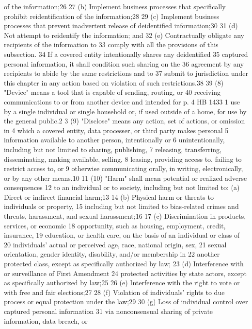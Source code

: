 of the information;26
27 (b) Implement business processes that specifically prohibit
reidentification of the information;28
29 (c) Implement business processes that prevent inadvertent release
of deidentified information;30
31 (d) Not attempt to reidentify the information; and
32 (e) Contractually obligate any recipients of the information to
33 comply with all the provisions of this subsection.
34 If a covered entity intentionally shares any deidentified
35 captured personal information, it shall condition such sharing on the
36 agreement by any recipients to abide by the same restrictions and to
37 submit to jurisdiction under this chapter in any action based on
violation of such restrictions.38
39 (8) "Device" means a tool that is capable of sending, routing, or
40 receiving communications to or from another device and intended for
p. 4 HB 1433
1 use by a single individual or single household or, if used outside of
a home, for use by the general public.2
3 (9) "Disclose" means any action, set of actions, or omission in
4 which a covered entity, data processer, or third party makes personal
5 information available to another person, intentionally or
6 unintentionally, including but not limited to sharing, publishing,
7 releasing, transferring, disseminating, making available, selling,
8 leasing, providing access to, failing to restrict access to, or
9 otherwise communicating orally, in writing, electronically, or by any
other means.10
11 (10) "Harm" shall mean potential or realized adverse consequences
12 to an individual or to society, including but not limited to:
(a) Direct or indirect financial harm;13
14 (b) Physical harm or threats to individuals or property,
15 including but not limited to bias-related crimes and threats,
harassment, and sexual harassment;16
17 (c) Discrimination in products, services, or economic
18 opportunity, such as housing, employment, credit, insurance,
19 education, or health care, on the basis of an individual or class of
20 individuals' actual or perceived age, race, national origin, sex,
21 sexual orientation, gender identity, disability, and/or membership in
22 another protected class, except as specifically authorized by law;
23 (d) Interference with or surveillance of First Amendment
24 protected activities by state actors, except as specifically
authorized by law;25
26 (e) Interference with the right to vote or with free and fair
elections;27
28 (f) Violation of individuals' rights to due process or equal
protection under the law;29
30 (g) Loss of individual control over captured personal information
31 via nonconsensual sharing of private information, data breach, or
